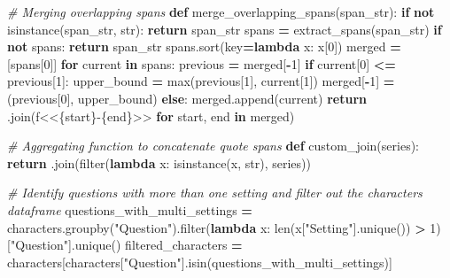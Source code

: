\documentclass[
]{article}
\newenvironment{Shaded}{\begin{snugshade}}{\end{snugshade}}
\newcommand{\BuiltInTok}[1]{#1}
\newcommand{\CommentTok}[1]{\textcolor[rgb]{0.56,0.35,0.01}{\textit{#1}}}
\newcommand{\ControlFlowTok}[1]{\textcolor[rgb]{0.13,0.29,0.53}{\textbf{#1}}}
\newcommand{\DecValTok}[1]{\textcolor[rgb]{0.00,0.00,0.81}{#1}}
\newcommand{\KeywordTok}[1]{\textcolor[rgb]{0.13,0.29,0.53}{\textbf{#1}}}
\newcommand{\NormalTok}[1]{#1}
\newcommand{\OperatorTok}[1]{\textcolor[rgb]{0.81,0.36,0.00}{\textbf{#1}}}
\newcommand{\SpecialCharTok}[1]{\textcolor[rgb]{0.00,0.00,0.00}{#1}}
\newcommand{\SpecialStringTok}[1]{\textcolor[rgb]{0.31,0.60,0.02}{#1}}
\newcommand{\StringTok}[1]{\textcolor[rgb]{0.31,0.60,0.02}{#1}}
\begin{document}
\begin{Shaded}
\begin{Highlighting}[]
\CommentTok{\# Merging overlapping spans}
\KeywordTok{def}\NormalTok{ merge\_overlapping\_spans(span\_str):}
    \ControlFlowTok{if} \KeywordTok{not} \BuiltInTok{isinstance}\NormalTok{(span\_str, }\BuiltInTok{str}\NormalTok{):}
        \ControlFlowTok{return}\NormalTok{ span\_str}
\NormalTok{    spans }\OperatorTok{=}\NormalTok{ extract\_spans(span\_str)}
    \ControlFlowTok{if} \KeywordTok{not}\NormalTok{ spans:}
        \ControlFlowTok{return}\NormalTok{ span\_str}
\NormalTok{    spans.sort(key}\OperatorTok{=}\KeywordTok{lambda}\NormalTok{ x: x[}\DecValTok{0}\NormalTok{])}
\NormalTok{    merged }\OperatorTok{=}\NormalTok{ [spans[}\DecValTok{0}\NormalTok{]]}
    \ControlFlowTok{for}\NormalTok{ current }\KeywordTok{in}\NormalTok{ spans:}
\NormalTok{        previous }\OperatorTok{=}\NormalTok{ merged[}\OperatorTok{{-}}\DecValTok{1}\NormalTok{]}
        \ControlFlowTok{if}\NormalTok{ current[}\DecValTok{0}\NormalTok{] }\OperatorTok{\textless{}=}\NormalTok{ previous[}\DecValTok{1}\NormalTok{]:}
\NormalTok{            upper\_bound }\OperatorTok{=} \BuiltInTok{max}\NormalTok{(previous[}\DecValTok{1}\NormalTok{], current[}\DecValTok{1}\NormalTok{])}
\NormalTok{            merged[}\OperatorTok{{-}}\DecValTok{1}\NormalTok{] }\OperatorTok{=}\NormalTok{ (previous[}\DecValTok{0}\NormalTok{], upper\_bound)}
        \ControlFlowTok{else}\NormalTok{:}
\NormalTok{            merged.append(current)}
    \ControlFlowTok{return} \StringTok{\textquotesingle{} \textquotesingle{}}\NormalTok{.join(}\SpecialStringTok{f\textquotesingle{}\textless{}\textless{}}\SpecialCharTok{\{}\NormalTok{start}\SpecialCharTok{\}}\SpecialStringTok{{-}}\SpecialCharTok{\{}\NormalTok{end}\SpecialCharTok{\}}\SpecialStringTok{\textgreater{}\textgreater{}\textquotesingle{}} \ControlFlowTok{for}\NormalTok{ start, end }\KeywordTok{in}\NormalTok{ merged)}

\CommentTok{\# Aggregating function to concatenate quote spans}
\KeywordTok{def}\NormalTok{ custom\_join(series):}
    \ControlFlowTok{return} \StringTok{\textquotesingle{} \textquotesingle{}}\NormalTok{.join(}\BuiltInTok{filter}\NormalTok{(}\KeywordTok{lambda}\NormalTok{ x: }\BuiltInTok{isinstance}\NormalTok{(x, }\BuiltInTok{str}\NormalTok{), series))}

\CommentTok{\# Identify questions with more than one setting and filter out the characters dataframe}
\NormalTok{questions\_with\_multi\_settings }\OperatorTok{=}\NormalTok{ characters.groupby(}\StringTok{"Question"}\NormalTok{).}\BuiltInTok{filter}\NormalTok{(}\KeywordTok{lambda}\NormalTok{ x: }\BuiltInTok{len}\NormalTok{(x[}\StringTok{"Setting"}\NormalTok{].unique()) }\OperatorTok{\textgreater{}} \DecValTok{1}\NormalTok{)[}\StringTok{"Question"}\NormalTok{].unique()}
\NormalTok{filtered\_characters }\OperatorTok{=}\NormalTok{ characters[characters[}\StringTok{"Question"}\NormalTok{].isin(questions\_with\_multi\_settings)]}


\end{Highlighting}
\end{Shaded}
\end{document}
